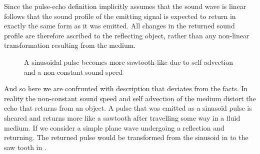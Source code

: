 
Since the pulse-echo definition implicitly assumes that the sound wave is linear
follows that the sound profile of the emitting signal is expected %
to return in exactly the same form as it was emitted.
All changes in the returned sound profile are therefore ascribed to the reflecting object,
rather than any non-linear transformation resulting from the medium.



 \begin{figure}
      \caption{A sinusoidal pulse becomes more sawtooth-like due to self advection and a non-constant sound speed}
      \label{fig:nonLinear}
 \end{figure}

And so here we are confrunted with description that deviates from the facts.
In reality the non-constant sound speed and self advection of the medium distort the echo that returns from an object.
%
A pulse that was emitted as a sinusoid pulse is sheared and returns more like a sawtooth after travelling some way in a fluid medium.
If we consider a simple plane wave undergoing a reflection and returning. %
The returned pulse would be transformed from the sinusoid in  to the saw tooth in .


